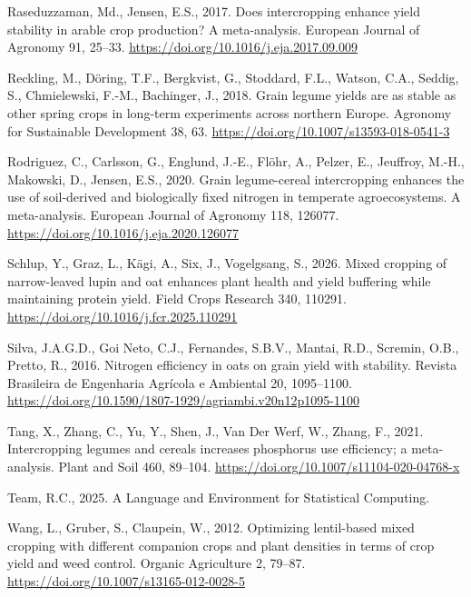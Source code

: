 \documentclass[
  british,
  a4paper,
  DIV=11,
  numbers=noendperiod]{scrreprt}
\newlength{\cslhangindent}
\newenvironment{CSLReferences}[2] %
 {\begin{list}{}{%
  \setlength{\itemindent}{0pt}
  \setlength{\leftmargin}{0pt}
  \setlength{\parsep}{0pt}
  \ifodd #1
   \setlength{\leftmargin}{\cslhangindent}
   \setlength{\itemindent}{-1\cslhangindent}
  \fi
  \setlength{\itemsep}{#2\baselineskip}}}
 {\end{list}}
\begin{document}
\begin{CSLReferences}{1}{0}
Raseduzzaman, Md., Jensen, E.S., 2017. Does intercropping enhance yield
stability in arable crop production? {A} meta-analysis. European Journal
of Agronomy 91, 25--33. \url{https://doi.org/10.1016/j.eja.2017.09.009}

Reckling, M., Döring, T.F., Bergkvist, G., Stoddard, F.L., Watson, C.A.,
Seddig, S., Chmielewski, F.-M., Bachinger, J., 2018. Grain legume yields
are as stable as other spring crops in long-term experiments across
northern {Europe}. Agronomy for Sustainable Development 38, 63.
\url{https://doi.org/10.1007/s13593-018-0541-3}

Rodriguez, C., Carlsson, G., Englund, J.-E., Flöhr, A., Pelzer, E.,
Jeuffroy, M.-H., Makowski, D., Jensen, E.S., 2020. Grain legume-cereal
intercropping enhances the use of soil-derived and biologically fixed
nitrogen in temperate agroecosystems. {A} meta-analysis. European
Journal of Agronomy 118, 126077.
\url{https://doi.org/10.1016/j.eja.2020.126077}

Schlup, Y., Graz, L., Kägi, A., Six, J., Vogelgsang, S., 2026. Mixed
cropping of narrow-leaved lupin and oat enhances plant health and yield
buffering while maintaining protein yield. Field Crops Research 340,
110291. \url{https://doi.org/10.1016/j.fcr.2025.110291}

Silva, J.A.G.D., Goi Neto, C.J., Fernandes, S.B.V., Mantai, R.D.,
Scremin, O.B., Pretto, R., 2016. Nitrogen efficiency in oats on grain
yield with stability. Revista Brasileira de Engenharia Agrícola e
Ambiental 20, 1095--1100.
\url{https://doi.org/10.1590/1807-1929/agriambi.v20n12p1095-1100}

Tang, X., Zhang, C., Yu, Y., Shen, J., Van Der Werf, W., Zhang, F.,
2021. Intercropping legumes and cereals increases phosphorus use
efficiency; a meta-analysis. Plant and Soil 460, 89--104.
\url{https://doi.org/10.1007/s11104-020-04768-x}

Team, R.C., 2025. A {Language} and {Environment} for {Statistical
Computing}.

Wang, L., Gruber, S., Claupein, W., 2012. Optimizing lentil-based mixed
cropping with different companion crops and plant densities in terms of
crop yield and weed control. Organic Agriculture 2, 79--87.
\url{https://doi.org/10.1007/s13165-012-0028-5}


\end{CSLReferences}
\end{document}
